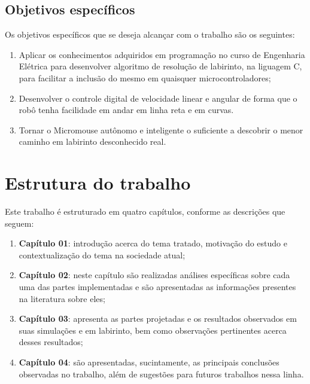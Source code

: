 \subsection{Objetivos específicos}
Os objetivos específicos que se deseja alcançar com o trabalho são os seguintes:

\begin{enumerate}[leftmargin=2cm,label=\alph*)]
	\item Aplicar os conhecimentos adquiridos em programação no curso de Engenharia Elétrica para desenvolver algoritmo de resolução de labirinto, na liguagem C, para facilitar a inclusão do mesmo em quaisquer microcontroladores;
	\item Desenvolver o controle digital de velocidade linear e angular de forma que o robô tenha facilidade em andar em linha reta e em curvas.
	\item Tornar o Micromouse autônomo e inteligente o suficiente a descobrir o menor caminho em labirinto desconhecido real.
\end{enumerate}


\section{Estrutura do trabalho}
Este trabalho é estruturado em quatro capítulos, conforme as descrições que seguem:

\begin{enumerate}[leftmargin=2cm,label=\alph*)]
	\item \textbf{Capítulo 01}: introdução acerca do tema tratado, motivação do estudo e contextualização do tema na sociedade atual;
	\item \textbf{Capítulo 02}: neste capítulo são realizadas análises específicas sobre cada uma das partes implementadas e são apresentadas as informações presentes na literatura sobre eles;
	\item \textbf{Capítulo 03}: apresenta as partes projetadas e os resultados observados em suas simulações e em labirinto, bem como observações pertinentes acerca desses resultados;
	\item \textbf{Capítulo 04}: são apresentadas, sucintamente, as principais conclusões observadas no trabalho, além de sugestões para futuros trabalhos nessa linha.
\end{enumerate}